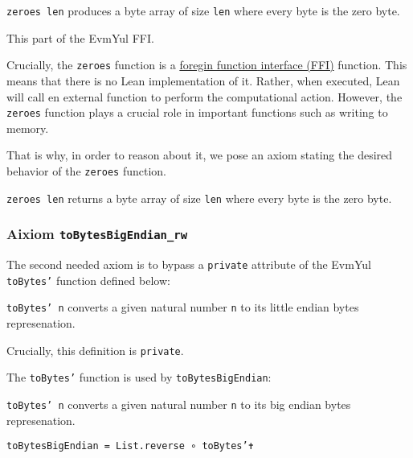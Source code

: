 \begin{definition}[zeroes]\label{def:zeroes}
\texttt{zeroes len} produces a byte array of size \texttt{len} where every byte
is the zero byte.

This part of the EvmYul FFI.
\end{definition}

Crucially, the \texttt{zeroes} function is a
\href{https://en.wikipedia.org/wiki/Foreign_function_interface}{foregin function interface (FFI)}
function. This means that there is no Lean implementation of it. Rather, when
executed, Lean will call en external function to perform the computational
action.
However, the \texttt{zeroes} function plays a crucial role in important
functions such as writing to memory.

That is why, in order to reason about it, we pose an axiom stating the desired
behavior of the \texttt{zeroes} function.

\begin{theorem}\label{ax:ffi_zeroes}
\texttt{zeroes len} returns a byte array of size \texttt{len} where every byte
is the zero byte.
\end{theorem}

\subsubsection{\textbf{Aixiom \texttt{toBytesBigEndian_rw}}}

The second needed axiom is to bypass a \texttt{private} attribute of the EvmYul
\texttt{toBytes'} function defined below:

\begin{definition}[toBytes']\label{def:toBytes'}\leanok
\texttt{toBytes' n} converts a given natural number \texttt{n} to its little
endian bytes represenation.

Crucially, this definition is \texttt{private}.
\end{definition}

The \texttt{toBytes'} function is used by \texttt{toBytesBigEndian}:

\begin{definition}[toBytesBigEndian]
\label{def:toBytesBigEndian}\leanok
\texttt{toBytes' n} converts a given natural number \texttt{n} to its big
endian bytes represenation.

\texttt{toBytesBigEndian = List.reverse ∘ toBytes'✝}
\end{definition}


